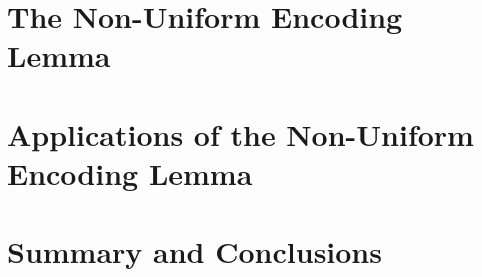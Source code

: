 \documentclass[lotsofwhite]{patmorin}
\begin{document}
\section{The Non-Uniform Encoding Lemma}

\section{Applications of the Non-Uniform Encoding Lemma}


\section{Summary and Conclusions}
\end{document}
